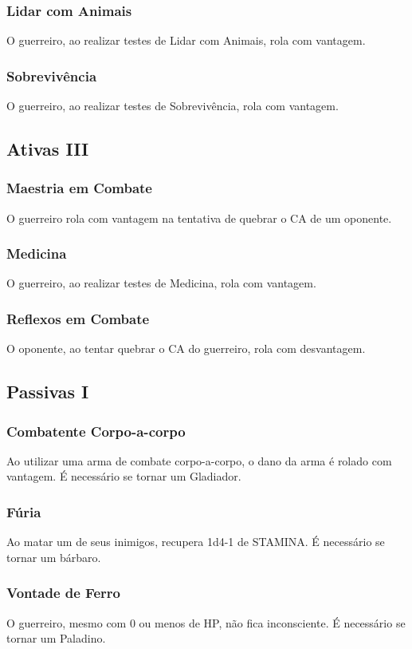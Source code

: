 \documentclass[10pt,twoside,twocolumn]{book}
\begin{document}
\subsubsection*{Lidar com Animais}
O guerreiro, ao realizar testes de Lidar com Animais, rola com vantagem.
\subsubsection*{Sobrevivência}
O guerreiro, ao realizar testes de Sobrevivência, rola com vantagem.

\subsection*{Ativas III}
\subsubsection*{Maestria em Combate}
O guerreiro rola com vantagem na tentativa de quebrar o CA de um oponente.
\subsubsection*{Medicina}
O guerreiro, ao realizar testes de Medicina, rola com vantagem.
\subsubsection*{Reflexos em Combate}
O oponente, ao tentar quebrar o CA do guerreiro, rola com desvantagem.

\subsection*{Passivas I}
\subsubsection*{Combatente Corpo-a-corpo}
Ao utilizar uma arma de combate corpo-a-corpo, o dano da arma é rolado com vantagem. É necessário se tornar um Gladiador. 
\subsubsection*{Fúria}
Ao matar um de seus inimigos, recupera 1d4-1 de STAMINA. É necessário se tornar um bárbaro. 
\subsubsection*{Vontade de Ferro}
O guerreiro, mesmo com 0 ou menos de HP, não fica inconsciente. É necessário se tornar um Paladino.
\end{document}
